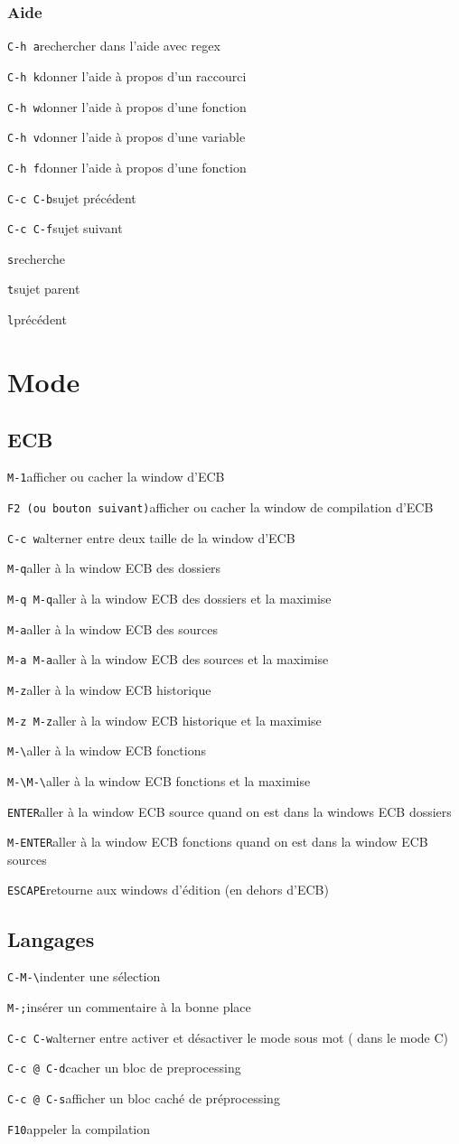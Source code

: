 \documentclass[10pt,landscape]{article}
\def\cm#1#2{{\tt#1}\dotfill#2\par}
\begin{document}
\begin{multicols}{3}
\subsubsection{Aide}
\cm{C-h a}{rechercher dans l'aide avec regex}
\cm{C-h k}{donner l'aide à propos d'un raccourci}
\cm{C-h w}{donner l'aide à propos d'une fonction}
\cm{C-h v}{donner l'aide à propos d'une variable}
\cm{C-h f}{donner l'aide à propos d'une fonction}
\cm{C-c C-b}{sujet précédent}
\cm{C-c C-f}{sujet suivant}
\cm{s}{recherche}
\cm{t}{sujet parent}
\cm{l}{précédent}






\section{Mode}

\subsection{ECB}
\cm{M-1}{afficher ou cacher la window d'ECB}
\cm{F2 (ou bouton suivant)}{afficher ou cacher la window de compilation d'ECB}
\cm{C-c w}{alterner entre deux taille de la window d'ECB}
\cm{M-q}{aller à la window ECB des dossiers}
\cm{M-q M-q}{aller à la window ECB des dossiers et la maximise}
\cm{M-a}{aller à la window ECB des sources}
\cm{M-a M-a}{aller à la window ECB des sources et la maximise}
\cm{M-z}{aller à la window ECB historique}
\cm{M-z M-z}{aller à la window ECB historique et la maximise}
\cm{M-\textbackslash}{aller à la window ECB fonctions}
\cm{M-\textbackslash M-\textbackslash}{aller à la window ECB fonctions et la maximise}
\cm{ENTER}{aller à la window ECB source quand on est dans la windows ECB dossiers}
\cm{M-ENTER}{aller à la window ECB fonctions quand on est dans la window ECB sources}
\cm{ESCAPE}{retourne aux windows d'édition (en dehors d'ECB)}





\subsection{Langages}
\cm{C-M-\textbackslash}{indenter une sélection}
\cm{M-;}{insérer un commentaire à la bonne place}
\cm{C-c C-w}{alterner entre activer et désactiver le mode sous mot ( dans le mode C)}
\cm{C-c @ C-d}{cacher un bloc de preprocessing}
\cm{C-c @ C-s}{afficher un bloc caché de préprocessing}
\cm{F10}{appeler la compilation}


\end{multicols}
\end{document}
